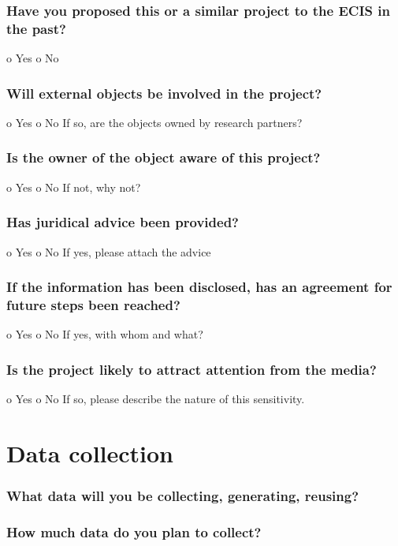 \documentclass[a4paper]{article}
\begin{document}
\subsubsection{Have you proposed this or a similar project to the ECIS in the past?}
o Yes
o No

\subsubsection{Will external objects be involved in the project?}
o Yes
o No
If so, are the objects owned by research partners?

\subsubsection{Is the owner of the object aware of this project?}
o Yes
o No
If not, why not?

\subsubsection{Has juridical advice been provided?}
o Yes
o No
If yes, please attach the advice

\subsubsection{If the information has been disclosed, has an agreement for future steps been reached?}
o Yes
o No
If yes, with whom and what?

\subsubsection{Is the project likely to attract attention from the media?}
o Yes
o No
If so, please describe the nature of this sensitivity.

\section{Data collection}

\subsubsection{What data will you be collecting, generating, reusing?}

\subsubsection{How much data do you plan to collect?}
\end{document}
